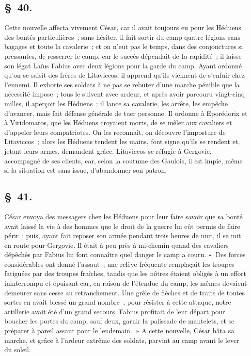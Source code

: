 \documentclass[french,twoside]{book} %
\begin{document}
\subsection[{§ 40.}]{ \textsc{§ 40.} }
\noindent Cette nouvelle affecta vivement César, car il avait toujours eu pour les Héduens des bontés particulières ; sans hésiter, il fait sortir du camp quatre légions sans bagages et toute la cavalerie ; et on n’eut pas le temps, dans des conjonctures si pressantes, de resserrer le camp, car le succès dépendait de Ia rapidité ; il laisse son légat Laïus Fabius avec deux légions pour la garde du camp. Ayant ordonné qu’on se saisît des frères de Litaviccos, il apprend qu’ils viennent de s’enfuir chez l’ennemi. Il exhorte ses soldats à ne pas se rebuter d’une marche pénible que la nécessité impose ; tous le suivent avec ardeur, et après avoir parcouru vingt-cinq milles, il aperçoit les Héduens ; il lance sa cavalerie, les arrête, les empêche d’avancer, mais fait défense générale de tuer personne. Il ordonne à Eporédorix et à Viridomaros, que les Héduens croyaient morts, de se mêler aux cavaliers et d’appeler leurs compatriotes. On les reconnaît, on découvre l’imposture de Litaviccos ; alors les Héduens tendent les mains, font signe qu’ils se rendent et, jetant leurs armes, demandent grâce. Litaviccos se réfugie à Gergovie, accompagné de ses clients, car, selon la coutume des Gaulois, il est impie, même si la situation est sans issue, d’abandonner son patron.
\subsection[{§ 41.}]{ \textsc{§ 41.} }
\noindent César envoya des messagers chez les Héduens pour leur faire savoir que sa bonté avait laissé la vie à des hommes que le droit de la guerre lui eût permis de faire périr ; puis, ayant fait reposer son armée pendant trois heures de nuit, il se mit en route pour Gergovie. Il était à peu près à mi-chemin quand des cavaliers dépêchés par Fabius lui font connaître quel danger le camp a couru. « Des forces considérables ont donné l’assaut ; une relève fréquente remplaçait les troupes fatiguées par des troupes fraîches, tandis que les nôtres étaient obligés à un effort ininterrompu et épuisant car, en raison de l’étendue du camp, les mêmes devaient demeurer sans cesse au retranchement. Une grêle de flèches et de traits de toutes sortes en avait blessé un grand nombre ; pour résister à cette attaque, notre artillerie avait été d’un grand secours. Fabius profitait de leur départ pour boucher les portes du camp, sauf deux, garnir la palissade de mantelets, et se préparer à pareil assaut pour le lendemain. » A cette nouvelle, César hâta sa marche, et grâce à l’ardeur extrême des soldats, parvint au camp avant le lever du soleil.
\end{document}
